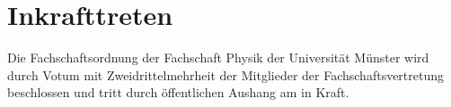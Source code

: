 \section{Inkrafttreten}
Die Fachschaftsordnung der Fachschaft Physik der Universität Münster wird durch Votum mit Zweidrittelmehrheit der Mitglieder der Fachschaftsvertretung beschlossen und tritt durch öffentlichen Aushang am  in Kraft.




